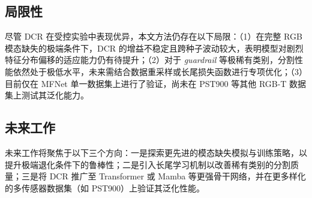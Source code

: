 \documentclass[10pt,conference]{IEEEtran}
\begin{document}
\subsection{局限性}
尽管 DCR 在受控实验中表现优异，本文方法仍存在以下局限：（1）在完整 RGB 模态缺失的极端条件下，DCR 的增益不稳定且跨种子波动较大，表明模型对剧烈特征分布偏移的适应能力仍有待提升；（2）对于 \textit{guardrail} 等极稀有类别，分割性能依然处于极低水平，未来需结合数据重采样或长尾损失函数进行专项优化；（3）目前仅在 MFNet 单一数据集上进行了验证，尚未在 PST900 等其他 RGB-T 数据集上测试其泛化能力。


\subsection{未来工作}

未来工作将聚焦于以下三个方向：一是探索更先进的模态缺失模拟与训练策略，以提升极端退化条件下的鲁棒性；二是引入长尾学习机制以改善稀有类别的分割质量；三是将 DCR 推广至 Transformer 或 Mamba 等更强骨干网络，并在更多样化的多传感器数据集（如 PST900）上验证其泛化性能。
\end{document}

